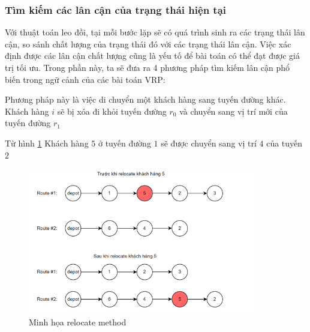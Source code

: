 \documentclass[12pt,a4paper]{article}\author{Nguyễn Nho Dũng}
\begin{document}
\subsubsection{Tìm kiếm các lân cận của trạng thái hiện tại}
Với thuật toán leo đồi, tại mỗi bước lặp sẽ có quá trình sinh ra các trạng thái lân cận, so sánh chất lượng của trạng thái đó với các trạng thái lân cận. Việc xác định được các lân cận chất lượng cũng là yếu tố để bài toán có thể đạt được giá trị tối ưu. Trong phần này, ta sẽ đưa ra 4 phương pháp tìm kiếm lân cận phổ biến trong ngữ cảnh của các bài toán VRP:
\begin{pphap}
	Phương pháp này là việc di chuyển một khách hàng sang tuyến đường khác. Khách hàng $i$ sẽ bị xóa đi khỏi tuyến đường $r_0$ và chuyển sang vị trí mới của tuyến đường $r_1$
\end{pphap}
\begin{vd}
	Từ hình \ref{relocate_method} Khách hàng $5$ ở tuyến đường $1$ sẽ được chuyển sang vị trí $4$ của tuyến $2$
\begin{figure}[H]
	\centering
	\includegraphics[width=0.9\textwidth]{Anh/relocate_method}
	\caption{Minh họa relocate method}
	\label{relocate_method}
\end{figure}
\end{vd}
\end{document}
